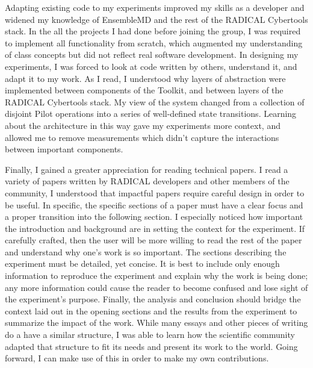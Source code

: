 \documentclass[]{article}
\begin{document}
	Adapting existing code to my experiments improved my skills as a developer and widened my knowledge of EnsembleMD and the rest of the RADICAL Cybertools stack. In the all the projects I had done before joining the group, I was required to implement all functionality from scratch, which augmented my understanding of class concepts but did not reflect real software development. In designing my experiments, I was forced to look at code written by others, understand it, and adapt it to my work. As I read, I understood why layers of abstraction were implemented between components of the Toolkit, and between layers of the RADICAL Cybertools stack. My view of the system changed from a collection of disjoint Pilot operations into a series of well-defined state transitions.	Learning about the architecture in this way gave my experiments more context, and allowed me to remove measurements which didn't capture the interactions between important components. 


	Finally, I gained a greater appreciation for reading technical papers. I read a variety of papers written by RADICAL developers and other members of the community, I understood that impactful papers require careful design in order to be useful. In specific, the specific sections of a paper must have a clear focus and a proper transition into the following section. I especially noticed how important the introduction and background are in setting the context for the experiment. If carefully crafted, then the user will be more willing to read the rest of the paper and understand why one's work is so important. The sections describing the experiment must be detailed, yet concise. It is best to include only enough information to reproduce the experiment and explain why the work is being done; any more information could cause the reader to become confused and lose sight of the experiment's purpose. Finally, the analysis and conclusion should bridge the context laid out in the opening sections and the results from the experiment to summarize the impact of the work. While many essays and other pieces of writing do a have a similar structure, I was able to learn how the scientific community adapted that structure to fit its needs and present its work to the world. Going forward, I can make use of this in order to make my own contributions.


\nocite{pstar}
\nocite{saga_paper}

{}
		
\end{document}
